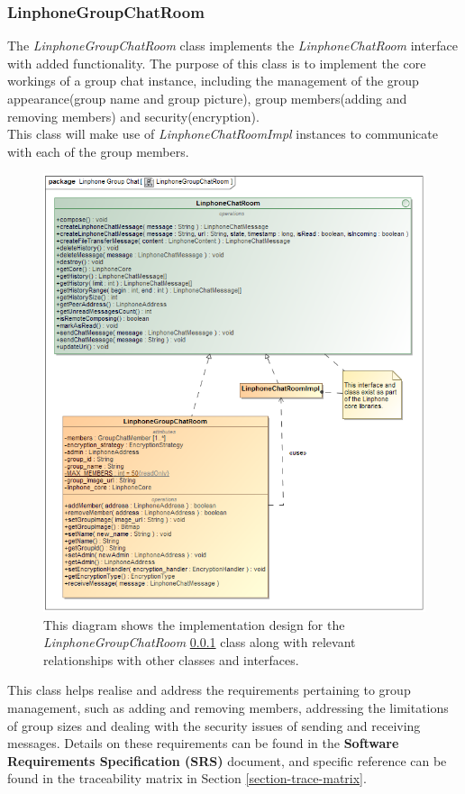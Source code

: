 \documentclass[11pt]{article}
\begin{document}
\subsubsection{LinphoneGroupChatRoom}\label{ssc: linphonegroupchatroom}
The \textit{LinphoneGroupChatRoom} class implements the \textit{LinphoneChatRoom} interface with added functionality. The purpose of this class is to implement the core workings of a group chat instance, including the management of the group appearance(group name and group picture), group members(adding and removing members) and security(encryption).\\
This class will make use of \textit{LinphoneChatRoomImpl} instances to communicate with each of the group members.
\begin{figure}[H]
	\centering
	\includegraphics[width=5in]{./images/class_group_chat.png}
	\caption[LinphoneGroupChatRoom Class Diagram]{This diagram shows the implementation design for the \textit{LinphoneGroupChatRoom} \ref{ssc: linphonegroupchatroom} class along with relevant relationships with other classes and interfaces.}
	\label{cd-group-chat}
\end{figure}
This class helps realise and address the requirements pertaining to group management, such as adding and removing members, addressing the limitations of group sizes and dealing with the security issues of sending and receiving messages. Details on these requirements can be found in the \textbf{Software Requirements Specification (SRS)} document, and specific reference can be found in the traceability matrix in Section \ref{section-trace-matrix}.
\end{document}
